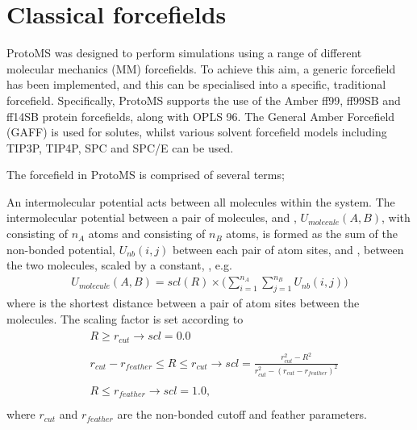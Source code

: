 \documentclass[letterpaper,10pt,english]{sphinxmanual}
\begin{document}
\ignorespaces 

\section{Classical forcefields}
\label{\detokenize{protoms:index-5}}\label{\detokenize{protoms:classical-forcefields}}
ProtoMS was designed to perform simulations using a range of different molecular mechanics (MM) forcefields. To achieve this aim, a generic forcefield has been implemented, and this can be specialised into a specific, traditional forcefield. Specifically, ProtoMS supports the use of the Amber ff99, ff99SB and ff14SB protein forcefields, along with OPLS 96. The General Amber Forcefield (GAFF) is used for solutes, whilst various solvent forcefield models including TIP3P, TIP4P, SPC and SPC/E can be used.

The forcefield in ProtoMS is comprised of several terms;

\ignorespaces 
{}

An intermolecular potential acts between all molecules within the system. The intermolecular potential between a pair of molecules,  and , \(U_{molecule} (A, B)\), with  consisting of \(n_A\) atoms and  consisting of \(n_B\) atoms, is formed as the sum of the non-bonded potential, \(U_{nb} (i, j)\) between each pair of atom sites,  and , between the two molecules, scaled by a constant, , e.g.
\begin{equation}\label{equation:protoms:intermol1}
\begin{split}U_{molecule}(A,B) = scl(R)\times\biggl( \sum_{i=1}^{n_A} \sum_{j=1}^{n_B} U_{nb}(i,j) \biggr)\end{split}
\end{equation}
where  is the shortest distance between a pair of atom sites between the molecules. The scaling factor is set according to
\begin{align*}\!\begin{aligned}
&R \ge r_{cut} \rightarrow scl = 0.0 \\\\
&r_{cut}-r_{feather} \le R \le r_{cut} \rightarrow scl = \frac{r_{cut}^2-R^2}{r_{cut}^2-(r_{cut}-r_{feather})^2} \\\\
&R \le r_{feather} \rightarrow scl = 1.0,\\
\end{aligned}\end{align*}
where \(r_{cut}\) and \(r_{feather}\) are the non-bonded cutoff and feather parameters.
\end{document}
